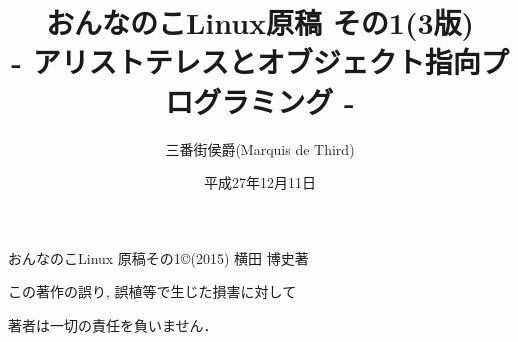 \documentclass[uplatex,b5j,8pt, twocolumn]{jsarticle}
\title{おんなのこLinux原稿 その1(3版)\\
{- アリストテレスとオブジェクト指向プログラミング -}}
\author{三番街侯爵(Marquis de Third)}
\date{
平成27年12月11日 
 }
\begin{document}
\maketitle

おんなのこLinux 原稿その1\copyright (2015) 横田 博史著\par

この著作の誤り, 誤植等で生じた損害に対して

著者は一切の責任を負いません．

\newpage
\setcounter{page}{1}


\end{document}
